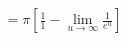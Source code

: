 \documentclass[preview]{standalone}
\begin{document}
\begin{align*}
= \pi [\frac{1}{1} - \lim_{u \to \infty} \frac{1}{e^u}]
\end{align*}
\end{document}
